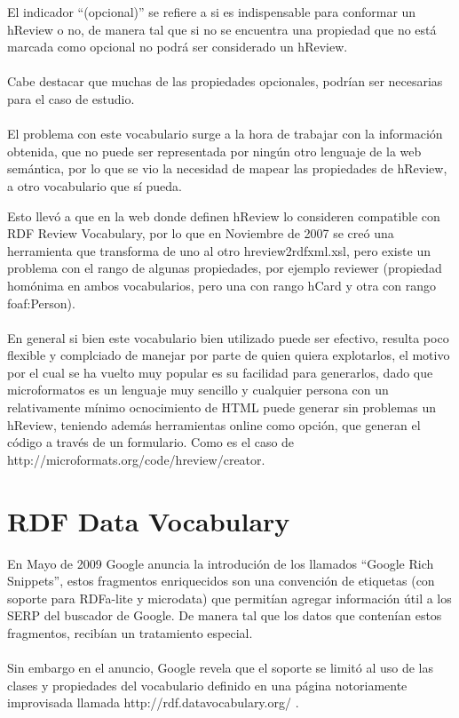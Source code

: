 El indicador ``(opcional)'' se refiere a si es indispensable para conformar un hReview o no, de manera tal que si no se encuentra una 
propiedad que no está marcada como opcional no podrá ser considerado un hReview.
\\\\
Cabe destacar que muchas de las propiedades opcionales, podrían ser necesarias para el caso de estudio.
\\\\
El problema con este vocabulario surge a la hora de trabajar con la información obtenida, que no puede ser representada por ningún otro 
lenguaje de la web semántica, por lo que se vio la necesidad de mapear las propiedades de hReview, a otro vocabulario que sí pueda.

Esto llevó a que en la web donde definen hReview lo consideren compatible con RDF Review Vocabulary, por lo que en Noviembre de 2007 
se creó una herramienta que transforma de uno al otro hreview2rdfxml.xsl,  pero existe un problema con el rango de algunas 
propiedades, por ejemplo reviewer (propiedad homónima en ambos vocabularios, pero una con rango hCard y otra con rango foaf:Person).
\\\\
En general si bien este vocabulario bien utilizado puede ser efectivo, resulta poco flexible y complciado de manejar por parte 
de quien quiera explotarlos, el motivo por el cual se ha vuelto muy popular es su facilidad para generarlos, dado que 
microformatos es un lenguaje muy sencillo y cualquier persona con un relativamente mínimo ocnocimiento de HTML puede generar 
sin problemas un hReview, teniendo además herramientas online como opción, que generan el código a través de un formulario. 
Como es el caso de \\\noindent http://microformats.org/code/hreview/creator. 


\section{RDF Data Vocabulary}
\label{section:data-vocabulary}

En Mayo de 2009 Google anuncia la introdución de los llamados ``Google Rich Snippets'', estos fragmentos enriquecidos son una convención 
de etiquetas (con soporte para RDFa-lite y microdata) que permitían agregar información útil a los SERP del buscador de Google. De manera tal 
que los datos que contenían estos fragmentos, recibían un tratamiento especial.
\\\\
Sin embargo en el anuncio, Google revela que el soporte se limitó al uso de las clases y propiedades del vocabulario definido en una página 
notoriamente improvisada llamada http://rdf.datavocabulary.org/ . 

